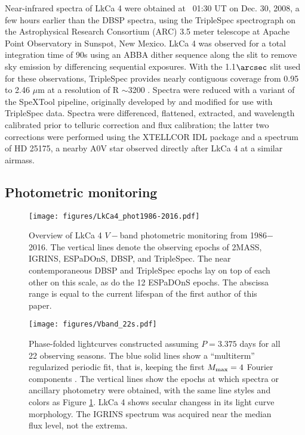 \documentclass[twocolumn]{emulateapj}%
\newcommand{\name}{LkCa 4 }
\begin{document}
Near-infrared spectra of LkCa 4 were obtained at ~01:30 UT on Dec. 30, 2008, a few hours earlier than the DBSP spectra, using the TripleSpec spectrograph on the Astrophysical Research Consortium (ARC) 3.5 meter telescope at Apache Point Observatory in Sunspot, New Mexico. LkCa 4 was observed for a total integration time of 90s using an ABBA dither sequence along the slit to remove sky emission by differencing sequential exposures.  With the 1.1$\arcsec$ slit used for these observations, TripleSpec provides nearly contiguous coverage from 0.95 to 2.46 $\mu$m at a resolution of  R $\sim$3200 \citep{wilson04}. Spectra were reduced with a variant of the SpeXTool pipeline, originally developed by \citet{cushing04} and modified for use with TripleSpec data. Spectra were differenced, flattened, extracted, and wavelength calibrated prior to telluric correction and flux calibration; the latter two corrections were performed using the XTELLCOR IDL package \citep{vacca03} and a spectrum of HD 25175, a nearby A0V star observed directly after LkCa 4 at a similar airmass. 


\subsection{Photometric monitoring}

\begin{figure*}
 \centering
 \texttt{[image: figures/LkCa4\_phot1986-2016.pdf]}
 \caption{Overview of \name $V-$band photometric monitoring from 1986$-$2016.  The vertical lines denote the observing epochs of 2MASS, IGRINS, ESPaDOnS, DBSP, and TripleSpec.  The near contemporaneous DBSP and TripleSpec epochs lay on top of each other on this scale, as do the 12 ESPaDOnS epochs.  The abscissa range is equal to the current lifespan of the first author of this paper.}
 \label{fig:PhotTime}
\end{figure*}

\begin{figure*}
 \centering
 \texttt{[image: figures/Vband\_22s.pdf]}
 \caption{Phase-folded lightcurves constructed assuming $P=3.375$ days for all 22 observing seasons.  The blue solid lines show a ``multiterm'' regularized periodic fit, that is, keeping the first $M_{\rm max}=4$ Fourier components \citep{vanderplas15a}.  The vertical lines show the epochs at which spectra or ancillary photometry were obtained, with the same line styles and colors as Figure \ref{fig:PhotTime}.  LkCa 4 shows secular changess in its light curve morphology.  The IGRINS spectrum was acquired near the median flux level, not the extrema.}
 \label{fig:PhotPhase}
\end{figure*}
\end{document}
